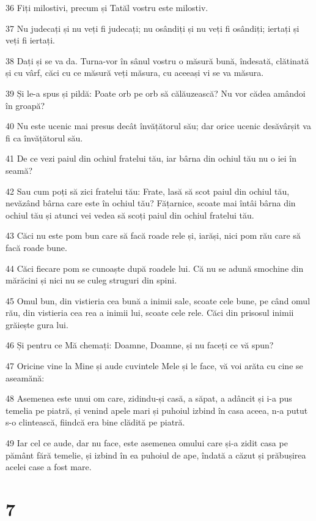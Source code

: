 \par 36 Fiți milostivi, precum și Tatăl vostru este milostiv.
\par 37 Nu judecați și nu veți fi judecați; nu osândiți și nu veți fi osândiți; iertați și veți fi iertați.
\par 38 Dați și se va da. Turna-vor în sânul vostru o măsură bună, îndesată, clătinată și cu vârf, căci cu ce măsură veți măsura, cu aceeași vi se va măsura.
\par 39 Și le-a spus și pildă: Poate orb pe orb să călăuzească? Nu vor cădea amândoi în groapă?
\par 40 Nu este ucenic mai presus decât învățătorul său; dar orice ucenic desăvârșit va fi ca învățătorul său.
\par 41 De ce vezi paiul din ochiul fratelui tău, iar bârna din ochiul tău nu o iei în seamă?
\par 42 Sau cum poți să zici fratelui tău: Frate, lasă să scot paiul din ochiul tău, nevăzând bârna care este în ochiul tău? Fățarnice, scoate mai întâi bârna din ochiul tău și atunci vei vedea să scoți paiul din ochiul fratelui tău.
\par 43 Căci nu este pom bun care să facă roade rele și, iarăși, nici pom rău care să facă roade bune.
\par 44 Căci fiecare pom se cunoaște după roadele lui. Că nu se adună smochine din mărăcini și nici nu se culeg struguri din spini.
\par 45 Omul bun, din vistieria cea bună a inimii sale, scoate cele bune, pe când omul rău, din vistieria cea rea a inimii lui, scoate cele rele. Căci din prisosul inimii grăiește gura lui.
\par 46 Și pentru ce Mă chemați: Doamne, Doamne, și nu faceți ce vă spun?
\par 47 Oricine vine la Mine și aude cuvintele Mele și le face, vă voi arăta cu cine se aseamănă:
\par 48 Asemenea este unui om care, zidindu-și casă, a săpat, a adâncit și i-a pus temelia pe piatră, și venind apele mari și puhoiul izbind în casa aceea, n-a putut s-o clintească, fiindcă era bine clădită pe piatră.
\par 49 Iar cel ce aude, dar nu face, este asemenea omului care și-a zidit casa pe pământ fără temelie, și izbind în ea puhoiul de ape, îndată a căzut și prăbușirea acelei case a fost mare.

\chapter{7}

